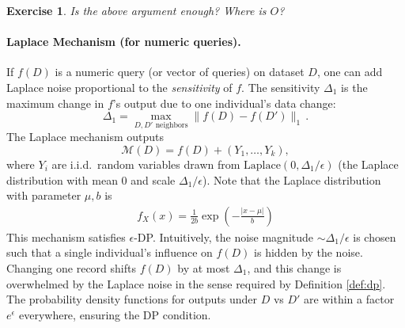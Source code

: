 \documentclass[11pt, a4paper]{article}
\newtheorem{exercise}{Exercise}
\begin{document}
\begin{exercise}
    Is the above argument enough?
    Where is $O$?
\end{exercise}

\paragraph{Laplace Mechanism (for numeric queries).} If $f(D)$ is a numeric query (or vector of queries) on dataset $D$, one can add Laplace noise proportional to the \emph{sensitivity} of $f$.
The sensitivity $\Delta_1$ is the maximum change in $f$'s output due to one individual's data change:
\[ \Delta_1 = \max_{D,D'\text{ neighbors}} \|f(D) - f(D')\|_1\,.\] 
The Laplace mechanism \cite{Dwork2006} outputs 
\[ \mathcal{M}(D) = f(D) + (Y_1,\dots,Y_k), \] 
where $Y_i$ are i.i.d.\ random variables drawn from $\text{Laplace}(0, \Delta_1/\epsilon)$ (the Laplace distribution with mean 0 and scale $\Delta_1/\epsilon$).
Note that the Laplace distribution with parameter $\mu, b$ is 
\begin{align}
    f_X(x) = \frac{1}{2b}\exp\left(-\frac{|x-\mu|}{b}\right)
\end{align}
This mechanism satisfies $\epsilon$-DP.
Intuitively, the noise magnitude $\sim \Delta_1/\epsilon$ is chosen such that a single individual's influence on $f(D)$ is hidden by the noise.
Changing one record shifts $f(D)$ by at most $\Delta_1$, and this change is overwhelmed by the Laplace noise in the sense required by Definition \ref{def:dp}.
The probability density functions for outputs under $D$ vs $D'$ are within a factor $e^{\epsilon}$ everywhere, ensuring the DP condition.
\end{document}
